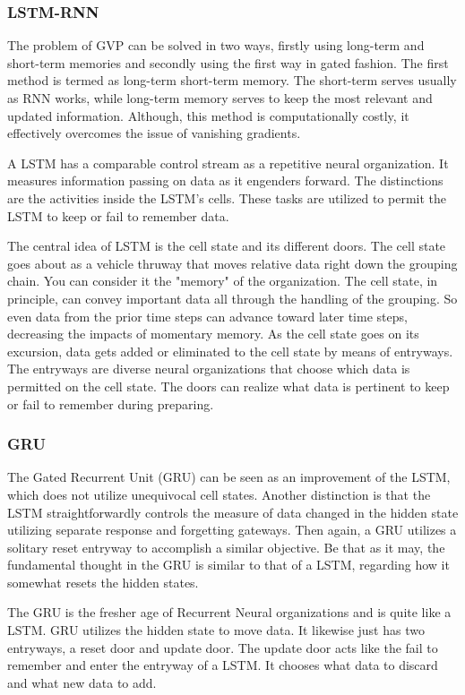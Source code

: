 \subsubsection{LSTM-RNN}

The problem of GVP can be solved in two ways, firstly using long-term and short-term memories and secondly using the first way in gated fashion. The first method is termed as long-term short-term memory. The short-term serves usually as RNN works, while long-term memory serves to keep the most relevant and updated information. Although, this method is computationally costly, it effectively overcomes the issue of vanishing gradients. 

A LSTM has a comparable control stream as a repetitive neural organization. It measures information passing on data as it engenders forward. The distinctions are the activities inside the LSTM's cells. These tasks are utilized to permit the LSTM to keep or fail to remember data. 

The central idea of LSTM is the cell state and its different doors. The cell state goes about as a vehicle thruway that moves relative data right down the grouping chain. You can consider it the "memory" of the organization. The cell state, in principle, can convey important data all through the handling of the grouping. So even data from the prior time steps can advance toward later time steps, decreasing the impacts of momentary memory. As the cell state goes on its excursion, data gets added or eliminated to the cell state by means of entryways. The entryways are diverse neural organizations that choose which data is permitted on the cell state. The doors can realize what data is pertinent to keep or fail to remember during preparing. 


\subsubsection{GRU}

The Gated Recurrent Unit (GRU) can be seen as an improvement of the LSTM, which does not utilize unequivocal cell states. Another distinction is that the LSTM straightforwardly controls the measure of data changed in the hidden state utilizing separate response and forgetting gateways. Then again, a GRU utilizes a solitary reset entryway to accomplish a similar objective. Be that as it may, the fundamental thought in the GRU is similar to that of a LSTM, regarding how it somewhat resets the hidden states. 

The GRU is the fresher age of Recurrent Neural organizations and is quite like a LSTM. GRU utilizes the hidden state to move data. It likewise just has two entryways, a reset door and update door. The update door acts like the fail to remember and enter the entryway of a LSTM. It chooses what data to discard and what new data to add.  

